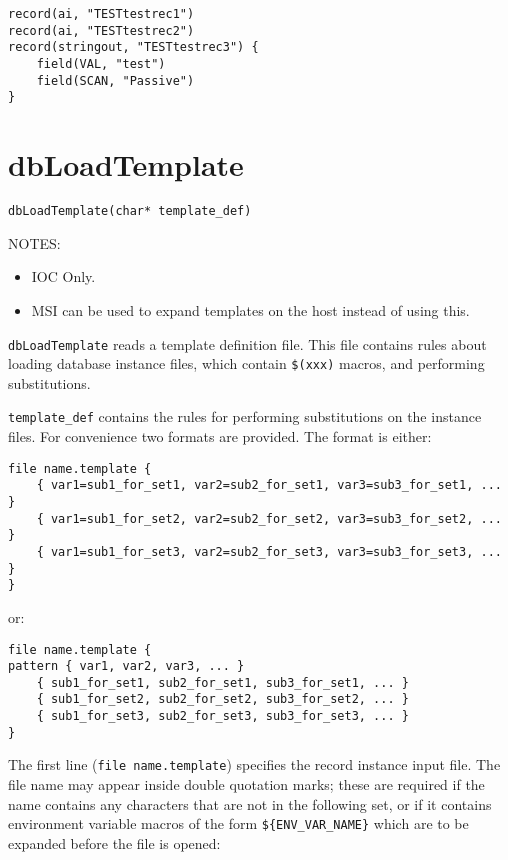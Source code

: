 \begin{verbatim}
record(ai, "TESTtestrec1")
record(ai, "TESTtestrec2")
record(stringout, "TESTtestrec3") {
    field(VAL, "test")
    field(SCAN, "Passive")
}
\end{verbatim}

\section{dbLoadTemplate}

\begin{verbatim}
dbLoadTemplate(char* template_def)
\end{verbatim}

NOTES:

\begin{itemize}
\item IOC Only.

\item MSI can be used to expand templates on the host instead of using this.

\end{itemize}

\verb|dbLoadTemplate| reads a template definition file. This file contains rules about loading database instance files, which
contain \verb|$(xxx)| macros, and performing substitutions.

\verb|template_def| contains the rules for performing substitutions on the instance files. For convenience two formats are
provided. The format is either:

\begin{verbatim}
file name.template {
    { var1=sub1_for_set1, var2=sub2_for_set1, var3=sub3_for_set1, ... }
    { var1=sub1_for_set2, var2=sub2_for_set2, var3=sub3_for_set2, ... }
    { var1=sub1_for_set3, var2=sub2_for_set3, var3=sub3_for_set3, ... }
}
\end{verbatim}

or:

\begin{verbatim}
file name.template {
pattern { var1, var2, var3, ... }
    { sub1_for_set1, sub2_for_set1, sub3_for_set1, ... }
    { sub1_for_set2, sub2_for_set2, sub3_for_set2, ... }
    { sub1_for_set3, sub2_for_set3, sub3_for_set3, ... }
}
\end{verbatim}

The first line (\verb|file name.template|) specifies the record instance input file. The file name may appear inside double
quotation marks; these are required if the name contains any characters that are not in the following set, or if it contains
environment variable macros of the form \verb|${ENV_VAR_NAME}| which are to be expanded before the file is opened:

